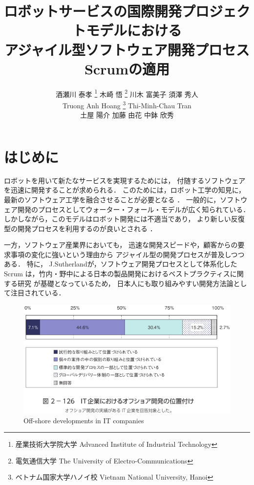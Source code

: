 \documentclass[a4j, 12Q, twocolumn, twoside]{jsarticle}
\title{ロボットサービスの国際開発プロジェクトモデルにおける\\
アジャイル型ソフトウェア開発プロセスScrumの適用}
\author{
  酒瀬川 泰孝
  \thanks{産業技術大学院大学 \newline
  Advanced Institute of Industrial Technology}
  木崎 悟
  \thanks{電気通信大学 \newline
  The University of Electro-Communications}
  川木 富美子
  \thanksmark[1]
  須澤 秀人
  \thanksmark[1]
  \\
  Truong Anh Hoang
  \thanks{ベトナム国家大学ハノイ校 \newline
  Vietnam National University, Hanoi}
  Thi-Minh-Chau Tran
  \thanksmark[3]
  \\
  土屋 陽介
  \thanksmark[1]
  加藤 由花
  \thanksmark[1]
  中鉢 欣秀
  \thanksmark[1]
}
\begin{document}
\amaketitle[-1pt]

\section{はじめに}

ロボットを用いて新たなサービスを実現するためには，
付随するソフトウェアを迅速に開発することが求められる．
このためには，ロボット工学の知見に，最新のソフトウェア工学を融合させることが必要となる
\cite{pons2012systematic}
．
一般的に，ソフトウェア開発のプロセスとしてウォーター・フォール・モデルが広く知られている．
しかしながら，このモデルはロボット開発には不適当であり，
より新しい反復型の開発プロセスを利用するのが良いとされる
\cite{kaindl2009iterative}
．

一方，ソフトウェア産業界においても，
迅速な開発スピードや，顧客からの要求事項の変化に強いという理由から
アジャイル型の開発プロセスが普及しつつある．
特に，
J.Sutherlandが，ソフトウェア開発プロセスとして体系化したScrum
\cite{sutherland2008agile}
\cite{sutherland2011scrum}
は，竹内・野中による日本の製品開発におけるベストプラクティスに関する研究
\cite{takeuchi1986new}
が基礎となっているため，
日本人にも取り組みやすい開発方法論として注目されている．

\begin{figure}
  \begin{center}
    \includegraphics[width=\columnwidth]{./figures/IT_Jinzai.png}
    \caption{Off-shore developments in IT companies}
    \label{fig:itjinzai}
  \end{center}
\end{figure}
\end{document}
